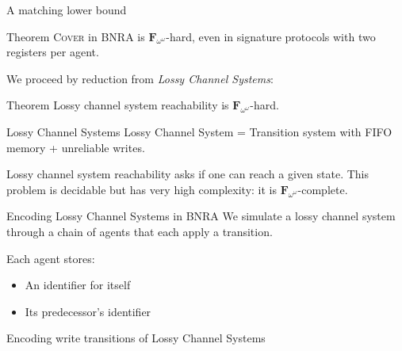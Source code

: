 \documentclass{beamer}
\newcommand{\COVER}{\textsc{Cover}}
\begin{document}
\begin{frame}{A matching lower bound}
		\begin{block}{Theorem}
		{\COVER{}} in BNRA is $\mathbf{F}_{\omega^\omega}$-hard, even in signature protocols with two registers per agent.
	\end{block}

	\pause 
	We proceed by reduction from \emph{Lossy Channel Systems}: 
	
	\begin{block}{Theorem\footnotemark}
		Lossy channel system reachability is $\mathbf{F}_{\omega^\omega}$-hard.
	\end{block}

\end{frame}


\begin{frame}{Lossy Channel Systems}
	Lossy Channel System = Transition system with FIFO memory + unreliable writes.
	
	\begin{center}
	\resizebox{!}{4.5cm}{
	
	}
	\end{center}

	 Lossy channel system reachability asks if one can reach a given state. This problem is decidable but has very high complexity: it is $\mathbf{F}_{\omega^\omega}$-complete. 
\end{frame}


\begin{frame}{Encoding Lossy Channel Systems in BNRA}
	We simulate a lossy channel system through a chain of agents that each apply a transition.
	
	Each agent stores:
	\begin{itemize}
		\item An identifier for itself
		
		\item Its predecessor's identifier
	\end{itemize} 
	
	\centering
	
	
\end{frame}


\begin{frame}{Encoding write transitions of Lossy Channel Systems}
	\centering
	

\end{frame}
\end{document}

